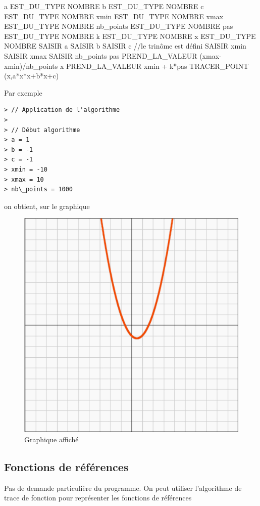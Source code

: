 \begin{algobox}
\Variables
\Ligne a EST\_DU\_TYPE NOMBRE
\Ligne b EST\_DU\_TYPE NOMBRE
\Ligne c EST\_DU\_TYPE NOMBRE
\Ligne xmin EST\_DU\_TYPE NOMBRE
\Ligne xmax EST\_DU\_TYPE NOMBRE
\Ligne nb\_points EST\_DU\_TYPE NOMBRE
\Ligne pas EST\_DU\_TYPE NOMBRE
\Ligne k EST\_DU\_TYPE NOMBRE
\Ligne x EST\_DU\_TYPE NOMBRE
\DebutAlgo
\Ligne SAISIR a
\Ligne SAISIR b
\Ligne SAISIR c
\Ligne //le trinôme est défini
\Ligne SAISIR xmin
\Ligne SAISIR xmax
\Ligne SAISIR nb\_points
\Ligne pas PREND\_LA\_VALEUR (xmax-xmin)/nb\_points
\DebutPour
\Ligne x PREND\_LA\_VALEUR xmin + k*pas
\Ligne TRACER\_POINT (x,a*x*x+b*x+c)
\FinPour
\FinAlgo

\end{algobox}
Par exemple
\begin{verbatim}
> // Application de l'algorithme
> 
> // Début algorithme
> a = 1
> b = -1
> c = -1
> xmin = -10
> xmax = 10
> nb\_points = 1000
\end{verbatim}
on obtient, sur le graphique
\begin{figure}[H]
\centering
\includegraphics[scale=0.3]{images/trace_trinome_xx_-x_-1.png}
\caption{Graphique affiché}
\end{figure}
\subsection{Fonctions de références}
Pas de demande particulière du programme. On peut utiliser l'algorithme de trace de fonction pour représenter les fonctions de références
